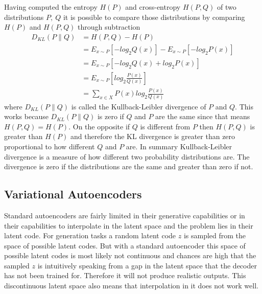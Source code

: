 Having computed the entropy $H(P)$ and cross-entropy $H(P,Q)$ of two distributions $P,\ Q$ it is 
possible to compare those distributions by comparing $H(P)$ and $H(P,Q)$ through subtraction
\begin{equation} \label{eq1}
    \begin{split}
        D_{KL}(P\parallel Q)    & = H(P,Q)-H(P) \\
                                & = E_{x\sim P}[-log_{2}Q(x)]-E_{x\sim P}[-log_{2}P(x)]\\
                                & = E_{x\sim P}[-log_{2}Q(x)+log_{2}P(x)]\\
                                & = E_{x\sim P}[log_{2}\frac{P(x)}{Q(x)}]\\
                                & = \sum_{x\in X} P(x)log_{2}\frac{P(x)}{Q(x)}
    \end{split}
\end{equation}
where $D_{KL}(P\parallel Q)$ is called the Kullback-Leibler divergence of $P$ and $Q$. This works
because $D_{KL}(P\parallel Q)$ is zero if $Q$ and $P$ are the same since that means $H(P,Q)=H(P)$.
On the opposite if $Q$ is different from $P$ then $H(P,Q)$ is greater than $H(P)$ and therefore 
the KL divergence is greater than zero proportional to how different $Q$ and $P$ are.
In summary Kullback-Leibler divergence is a measure of how different two probability distributions
are. The divergence is zero if the distributions are the same and greater than zero if not.

\subsection{Variational Autoencoders} \label{vae_background}

Standard autoencoders are fairly limited in their generative capabilities or in their capabilities
to interpolate in the latent space and the problem lies
in their latent code. For generation tasks a random latent code $z$ is sampled from the space of
possible latent codes. But with a standard autoencoder this space of possible latent codes is most
likely not continuous and chances are high that the sampled $z$ is intuitively speaking
from a gap in the latent space that the decoder has not been trained for. Therefore it will not
produce realistic outputs. This discontinuous latent space also means that interpolation in it
does not work well.

